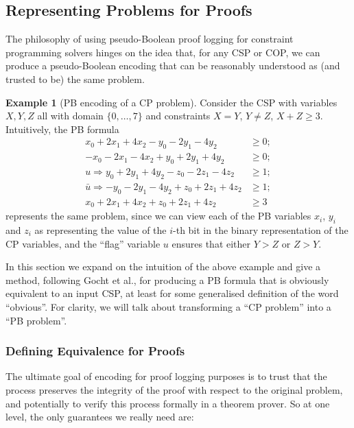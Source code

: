 \documentclass[11pt,a4paper]{article}
\theoremstyle{plain}
\theoremstyle{definition}
\newtheorem{exampleT}{Example}
\theoremstyle{remark}
\begin{document}
\subsection{Representing Problems for Proofs}
\label{sec:representing}

The philosophy of using pseudo-Boolean proof logging for constraint programming
solvers hinges on the idea that, for any CSP or COP, we can produce a
pseudo-Boolean encoding that can be reasonably understood as (and trusted to
be) the same problem.

\setcounter{exampleT}{2}
\begin{exampleT}[PB encoding of a CP problem]
\label{ex:pbenc}
Consider the CSP with variables $X,Y,Z$ all with domain $\{0,\dots,7\}$ and
constraints $X=Y$, $Y\neq Z$, $X+Z\geq 3$.  Intuitively, the PB formula
\begin{align}
  x_0+2x_1+4x_2-y_0-2y_1-4y_2 &\geq 0; \label{eq:ex1}\\
  -x_0-2x_1-4x_2+y_0+2y_1+4y_2 &\geq 0; \\
  u \Rightarrow y_0+2y_1+4y_2-z_0-2z_1-4z_2 &\geq 1;\\
  \bar u \Rightarrow -y_0-2y_1-4y_2+z_0+2z_1+4z_2 &\geq 1;\\
  x_0+2x_1+4x_2+z_0+2z_1+4z_2 &\geq 3 \label{eq:ex5}
\end{align}
represents the same problem, since we can view each of the PB variables $x_i$,
$y_i$ and $z_i$ as representing the value of the $i$-th bit in the binary
representation of the CP variables, and the ``flag'' variable $u$ ensures that
either $Y>Z$ or $Z>Y$.
\end{exampleT}

In this section we expand on the intuition of the above example and give a
method, following Gocht et al., for producing a PB formula that is obviously
equivalent to an input CSP, at least for some generalised definition of the
word ``obvious''.  For clarity, we will talk about transforming a ``CP
problem'' into a ``PB problem''.

\subsubsection{Defining Equivalence for Proofs}

The ultimate goal of encoding for proof logging purposes is to trust that the
process preserves the integrity of the proof with respect to the original
problem, and potentially to verify this process formally in a theorem prover.
So at one level, the only guarantees we really need are:
\end{document}
